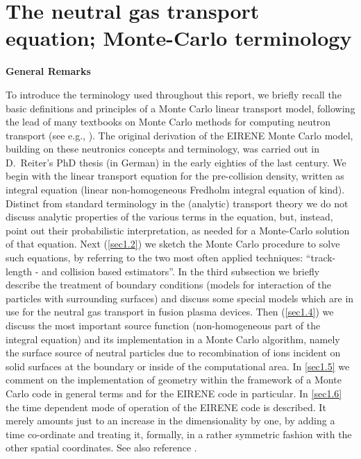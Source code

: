 \chapter{The neutral gas transport equation; Monte-Carlo terminology}
\label{sec1}

\textbf{General Remarks} 

\medskip 

To introduce the terminology used throughout this report, we briefly recall the
basic definitions and principles of a Monte Carlo linear transport model,
following the lead of many textbooks on Monte Carlo methods for computing
neutron transport (see e.g., \cite{kn:Spanier69a}).
The original derivation of the EIRENE Monte Carlo model, building on these
neutronics concepts and terminology, was carried out in D.~Reiter's PhD thesis
(in German) \cite{kn:Reiter84a} in the early eighties of the last century.
We begin with the linear transport equation for the pre-collision density,
written as integral equation (linear non-homogeneous Fredholm integral equation
of  kind).
Distinct from standard terminology in the (analytic) transport theory we do not
discuss analytic properties of the various terms in the equation, but, instead,
point out their probabilistic interpretation, as needed for a Monte-Carlo
solution of that equation.
Next (\cref{sec1.2}) we sketch the Monte Carlo procedure to solve such
equations, by referring to the two most often applied techniques:
``track-length - and collision based estimators''.
In the third subsection we briefly describe the treatment of boundary
conditions (models for interaction of the particles with surrounding surfaces)
and discuss some special models which are in use for the neutral gas transport
in fusion plasma devices.
Then (\cref{sec1.4}) we discuss the most important source function
(non-homogeneous part of the integral equation) and its implementation in a
Monte Carlo algorithm, namely the surface source of neutral particles due to
recombination of ions incident on solid surfaces at the boundary or inside of
the computational area.
In \cref{sec1.5} we comment on the implementation of geometry within the
framework of a Monte Carlo code in general terms and for the EIRENE code in
particular.
In \cref{sec1.6} the time dependent mode of operation of the EIRENE code is
described.
It merely amounts just to an increase in the dimensionality by one, by adding a
time co-ordinate and treating it, formally, in a rather symmetric fashion with
the other spatial coordinates.
See also reference \cite{kn:Reiter94}.

